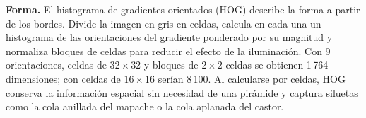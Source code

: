 \textbf{Forma.} El histograma de gradientes orientados (HOG) describe la forma a partir de los bordes. Divide la imagen en gris en celdas, calcula en cada una un histograma de las orientaciones del gradiente ponderado por su magnitud y normaliza bloques de celdas para reducir el efecto de la iluminación. Con 9 orientaciones, celdas de $32\times32$ y bloques de $2\times2$ celdas se obtienen 1\,764 dimensiones; con celdas de $16\times16$ serían 8\,100. Al calcularse por celdas, HOG conserva la información espacial sin necesidad de una pirámide y captura siluetas como la cola anillada del mapache o la cola aplanada del castor.
